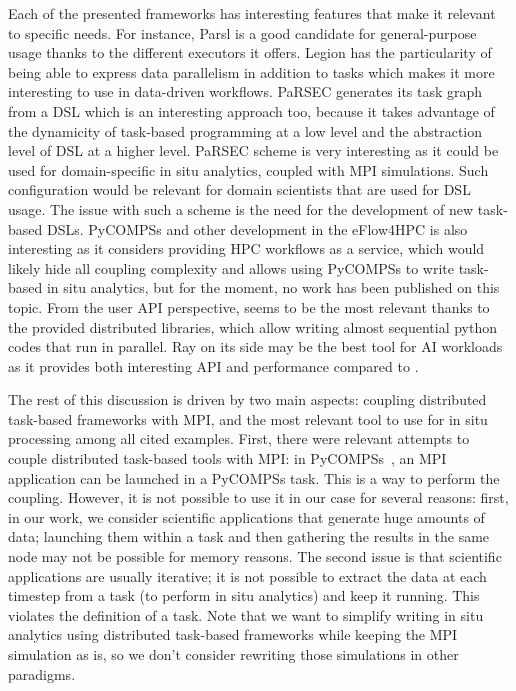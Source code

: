 Each of the presented frameworks has interesting features that make it relevant to specific needs. For instance, 
Parsl is a good candidate for general-purpose usage thanks to the different executors it offers. 
Legion has the particularity of being able to express data parallelism in addition to tasks which makes it more interesting to use in data-driven workflows. 
PaRSEC generates its task graph from a DSL which is an interesting approach too, because it takes advantage of the dynamicity of task-based programming at a low level and the abstraction level of DSL at a higher level. 
PaRSEC scheme is very interesting as it could be used for domain-specific in situ analytics, coupled with MPI simulations. Such configuration would be relevant for domain scientists that are used for DSL usage. The issue with such a scheme is the need for the development of new task-based DSLs.
PyCOMPSs and other development in the eFlow4HPC is also interesting as it considers providing HPC workflows as a service, which would likely hide all coupling complexity and allows using PyCOMPSs to write task-based in situ analytics, but for the moment, no work has been published on this topic. 
From the user API perspective, \dask seems to be the most relevant thanks to the provided distributed libraries, which allow writing  almost sequential python codes that run in parallel.  Ray on its side may be the best tool for AI workloads as it provides both interesting API and performance compared to \dask.

The rest of this discussion is driven by two main aspects: coupling distributed task-based frameworks with MPI, and the most relevant tool to use for in situ processing among all cited examples.
First, there were relevant attempts to couple distributed task-based tools with MPI: 
in PyCOMPSs~\cite{elshazly_performance_2020_pycompss}, an MPI application can be launched in a PyCOMPSs task. This is a way to perform the coupling. However, it is not possible to use it in our case for several reasons: 
first, in our work, we consider scientific applications that generate huge amounts of data; launching them within a task and then gathering the results in the same node may not be possible for memory reasons. The second issue is that scientific applications are usually iterative; it is not possible to extract the data at each timestep from a task (to perform in situ analytics) and keep it running. This violates the definition of a task. Note that we want to simplify writing in situ analytics using distributed task-based frameworks while keeping the MPI simulation as is, so we don't consider rewriting those simulations in other paradigms.  


